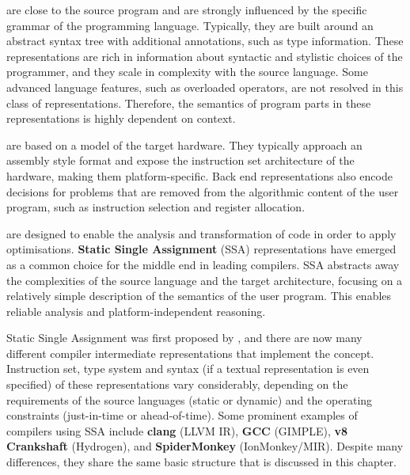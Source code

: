     \begin{description}[style=unboxed,leftmargin=0cm,labelindent=\parindent]
    \item[Front end representations] are close to the source program and
    are strongly influenced by the specific grammar of the programming language.
    Typically, they are built around an abstract syntax tree with additional
    annotations, such as type information.
    These representations are rich in information about syntactic and stylistic
    choices of the programmer, and they scale in complexity with the source
    language.
    Some advanced language features, such as overloaded operators, are not
    resolved in this class of representations.
    Therefore, the semantics of program parts in these representations
    is highly dependent on context.

    \item[\bf Back end representations] are based on a model of the target
    hardware.
    They typically approach an assembly style format and expose the instruction
    set architecture of the hardware, making them platform-specific.
    Back end representations also encode decisions for problems that are removed
    from the algorithmic content of the user program, such as instruction
    selection and register allocation.

    \item[\bf Middle end representations] are designed to enable the analysis
    and transformation of code in order to apply optimisations.
    {\bf Static Single Assignment} (SSA) representations have emerged as a
    common choice for the middle end in leading compilers.
    SSA abstracts away the complexities of the source language and the
    target architecture, focusing on a relatively simple description of the
    semantics of the user program.
    This enables reliable analysis and platform-independent reasoning.
    \end{description}

    Static Single Assignment was first proposed by
    \citet{Rosen:1988:GVN:73560.73562}, and there are now many different
    compiler intermediate representations that implement the concept.
    Instruction set, type system and syntax
    (if a textual representation is even specified) of these representations
    vary considerably, depending on the requirements of the source languages
    (static or dynamic) and the operating constraints
    (just-in-time or ahead-of-time).
    Some prominent examples of compilers using SSA include
    {\bf clang} (LLVM IR), {\bf GCC} (GIMPLE), {\bf v8 Crankshaft} (Hydrogen),
    and {\bf SpiderMonkey} (IonMonkey/MIR).
    Despite many differences, they share the same basic structure that is
    discussed in this chapter.

